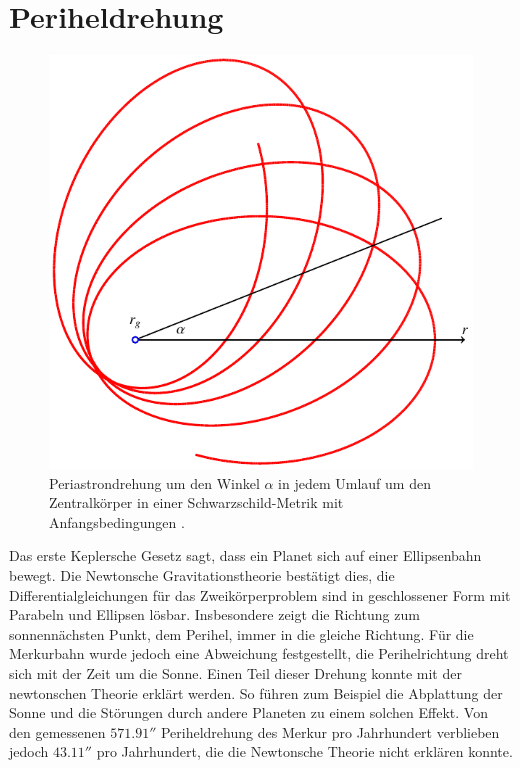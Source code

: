 %
%
%

\section{Periheldrehung%
\label{skript:chapters:s-perihel}}
\begin{figure}
\centering
\includegraphics{chapters/tikz/orbit.pdf}
\caption{Periastrondrehung um den Winkel $\alpha$ in jedem Umlauf um den
Zentralkörper in einer Schwarzschild-Metrik mit Anfangsbedingungen
\label{skript:schwarzschild:anfangsbedingung:normal}.
\label{skript:schwarzschild:perihelorbit}}
\end{figure}
Das erste Keplersche Gesetz sagt, dass ein Planet sich auf einer
%
Ellipsenbahn bewegt.
%
Die Newtonsche Gravitationstheorie bestätigt dies, die Differentialgleichungen
für das Zweikörperproblem sind in geschlossener Form
%
mit Parabeln und Ellipsen lösbar.
%
Insbesondere zeigt die Richtung zum sonnennächsten Punkt, dem Perihel,
immer in die gleiche Richtung.
Für die Merkurbahn wurde jedoch eine Abweichung festgestellt, die
Perihelrichtung dreht sich mit der Zeit um die Sonne.
Einen Teil dieser Drehung konnte mit der newtonschen Theorie erklärt werden.
So führen zum Beispiel die Abplattung der Sonne und die Störungen durch
andere Planeten zu einem solchen Effekt.
Von den gemessenen $571.91''$ Periheldrehung des Merkur pro Jahrhundert
verblieben jedoch $43.11''$ pro Jahrhundert, die die Newtonsche
Theorie nicht erklären konnte.

